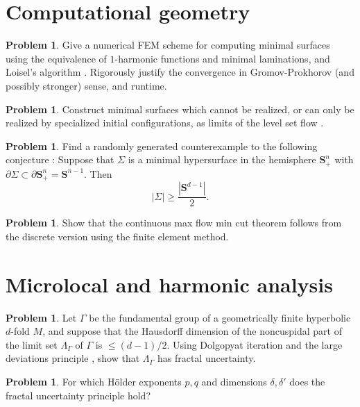 \documentclass[reqno,11pt]{amsart}
\newcommand{\Sph}{\mathbf S}
\theoremstyle{definition}
\newtheorem{problem}[theorem]{Problem}
\numberwithin{equation}{section}
\begin{document}
\section{Computational geometry}
\begin{problem}
Give a numerical FEM scheme for computing minimal surfaces using the equivalence of $1$-harmonic functions and minimal laminations, and Loisel's algorithm \cite{Loisel20}.
Rigorously justify the convergence in Gromov-Prokhorov (and possibly stronger) sense, and runtime.
\end{problem}

\begin{problem}
Construct minimal surfaces which cannot be realized, or can only be realized by specialized initial configurations, as limits of the level set flow \cite{CHOPP199377}.
\end{problem}

\begin{problem}
Find a randomly generated counterexample to the following conjecture \cite[Conjecture 5.3]{naff2022prescribed}:
Suppose that $\Sigma$ is a minimal hypersurface in the hemisphere $\Sph^n_+$ with $\partial \Sigma \subset \partial \Sph^n_+ = \Sph^{n - 1}$.
Then
$$|\Sigma| \geq \frac{|\Sph^{d - 1}|}{2}.$$
\end{problem}

\begin{problem}
Show that the continuous max flow min cut theorem follows from the discrete version using the finite element method.
\end{problem}

\section{Microlocal and harmonic analysis}
\begin{problem}
Let $\Gamma$ be the fundamental group of a geometrically finite hyperbolic $d$-fold $M$, and suppose that the Hausdorff dimension of the noncuspidal part of the limit set $\Lambda_\Gamma$ of $\Gamma$ is $\leq (d - 1)/2$.
Using Dolgopyat iteration and the large deviations principle \cite{Li_2022}, show that $\Lambda_\Gamma$ has fractal uncertainty.
\end{problem}

\begin{problem}
For which H\"older exponents $p, q$ and dimensions $\delta, \delta'$ does the fractal uncertainty principle hold?
\end{problem}
\end{document}
